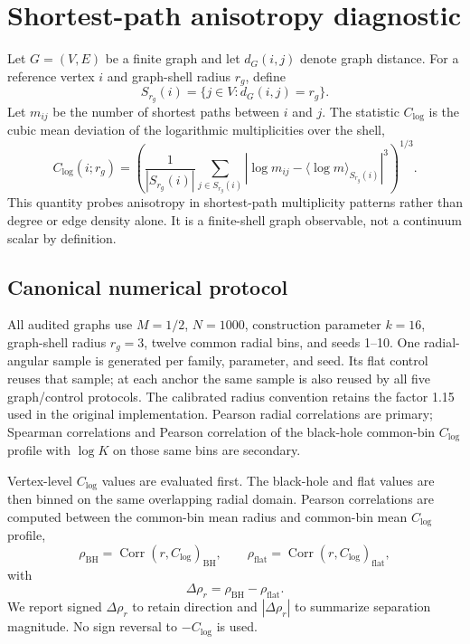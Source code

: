 \documentclass[11pt]{article}
\newcommand{\clog}{C_{\log}}
\newcommand{\drho}{\Delta\rho_r}
\begin{document}
\section{Shortest-path anisotropy diagnostic}

Let $G=(V,E)$ be a finite graph and let $d_G(i,j)$ denote graph distance. For a
reference vertex $i$ and graph-shell radius $r_g$, define
\begin{equation}
    S_{r_g}(i) = \{j \in V : d_G(i,j)=r_g\}.
\end{equation}
Let $m_{ij}$ be the number of shortest paths between $i$ and $j$. The statistic
$\clog$ is the cubic mean deviation of the logarithmic multiplicities over the
shell,
\begin{equation}
    \clog(i;r_g)
    =
    \left(
    \frac{1}{|S_{r_g}(i)|}
    \sum_{j\in S_{r_g}(i)}
    \left|
    \log m_{ij} - \langle \log m \rangle_{S_{r_g}(i)}
    \right|^3
    \right)^{1/3}.
    \label{eq:clog}
\end{equation}
This quantity probes anisotropy in shortest-path multiplicity patterns rather
than degree or edge density alone. It is a finite-shell graph observable, not a
continuum scalar by definition.

\subsection{Canonical numerical protocol}
\label{sec:numerical-protocol}

All audited graphs use $M=1/2$, $N=1000$, construction parameter $k=16$,
graph-shell radius $r_g=3$, twelve common radial bins, and seeds 1--10. One
radial-angular sample is generated per family, parameter, and seed. Its flat
control reuses that sample; at each anchor the same sample is also reused by all
five graph/control protocols. The calibrated radius convention retains the
factor 1.15 used in the original implementation. Pearson radial correlations
are primary; Spearman correlations and Pearson correlation of the black-hole
common-bin $\clog$ profile with $\log K$ on those same bins are secondary.

Vertex-level $\clog$ values are evaluated first. The black-hole and flat values
are then binned on the same overlapping radial domain. Pearson correlations are
computed between the common-bin mean radius and common-bin mean $\clog$ profile,
\begin{equation}
    \rho_{\mathrm{BH}}
    =\operatorname{Corr}\!\left(r,\clog\right)_{\mathrm{BH}},
    \qquad
    \rho_{\mathrm{flat}}
    =\operatorname{Corr}\!\left(r,\clog\right)_{\mathrm{flat}},
\end{equation}
with
\begin{equation}
    \drho = \rho_{\mathrm{BH}}-\rho_{\mathrm{flat}}.
    \label{eq:delta-rho}
\end{equation}
We report signed $\drho$ to retain direction and $|\drho|$ to summarize
separation magnitude. No sign reversal to $-\clog$ is used.
\end{document}
